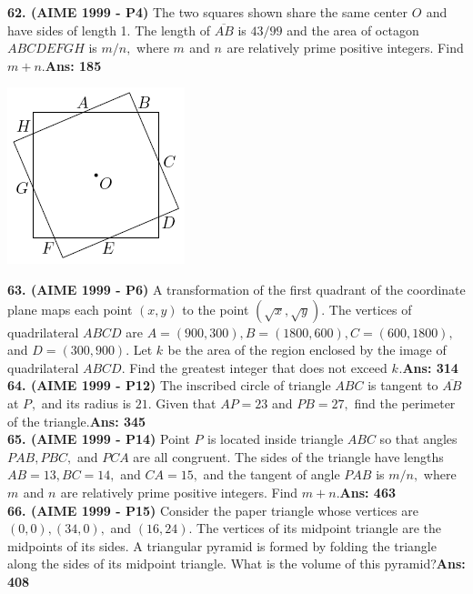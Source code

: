 \documentclass[letterpaper,10pt,addpoints]{exam}
\begin{document}
\textbf{62. (AIME 1999 - P4) }The two squares shown share the same center $O_{}$ and have sides of length 1. The length of $\overline{AB}$ is $43/99$ and the area of octagon $ABCDEFGH$ is  $m/n,$ where $m_{}$ and $n_{}$ are relatively prime positive integers. Find $m+n.$\quad\textbf{Ans: 185}

\begin{center}
\includegraphics[scale=0.6]{AIME_1999_Problem_4.png}
\end{center}

\textbf{63. (AIME 1999 - P6) }A transformation of the first quadrant of the coordinate plane maps each point $(x,y)$ to the point $(\sqrt{x},\sqrt{y}).$ The vertices of quadrilateral $ABCD$ are $A=(900,300), B=(1800,600), C=(600,1800),$ and $D=(300,900).$ Let $k_{}$ be the area of the region enclosed by the image of quadrilateral $ABCD.$ Find the greatest integer that does not exceed $k_{}.$\quad\textbf{Ans: 314}\\

\textbf{64. (AIME 1999 - P12) }The inscribed circle of triangle $ABC$ is tangent to $\overline{AB}$ at $P_{},$ and its radius is $21$. Given that $AP=23$ and $PB=27,$ find the perimeter of the triangle.\quad\textbf{Ans: 345}\\

\textbf{65. (AIME 1999 - P14) }Point $P_{}$ is located inside triangle $ABC$ so that angles $PAB, PBC,$ and $PCA$ are all congruent. The sides of the triangle have lengths $AB=13, BC=14,$ and $CA=15,$ and the tangent of angle $PAB$ is $m/n,$ where $m_{}$ and $n_{}$ are relatively prime positive integers. Find $m+n.$\quad\textbf{Ans: 463}\\

\textbf{66. (AIME 1999 - P15) }Consider the paper triangle whose vertices are $(0,0), (34,0),$ and $(16,24).$ The vertices of its midpoint triangle are the midpoints of its sides. A triangular pyramid is formed by folding the triangle along the sides of its midpoint triangle. What is the volume of this pyramid?\quad\textbf{Ans: 408}\\
\end{document}

